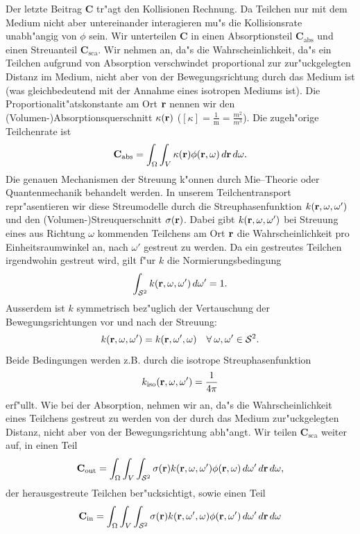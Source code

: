 	Der letzte Beitrag $\mathbf{C}$ tr"agt den Kollisionen Rechnung. Da Teilchen nur mit dem Medium nicht aber untereinander interagieren mu"s die Kollisionsrate unabh"angig von $\phi$ sein. Wir unterteilen $\mathbf{C}$ in einen Absorptionsteil $\mathbf{C}_\text{abs}$ und einen Streuanteil $\mathbf{C}_\text{sca}$. Wir nehmen an, da"s die Wahrscheinlichkeit, da"s ein Teilchen aufgrund von Absorption verschwindet proportional zur zur"uckgelegten Distanz im Medium, nicht aber von der Bewegungsrichtung durch das Medium ist (was gleichbedeutend mit der Annahme eines isotropen Mediums ist). Die Proportionalit"atskonstante am Ort $\mathbf{r}$ nennen wir den (Volumen-)Absorptionsquerschnitt $\kappa(\mathbf{r})$ ($[\kappa]=\frac{1}{\text{m}}=\frac{m^2}{m^3}$). Die zugeh"orige Teilchenrate ist
	$$\mathbf{C}_\text{abs}=\int_\Omega \int_V \kappa(\mathbf{r})\phi(\mathbf{r},\omega)\,d\mathbf{r}\,d\omega.$$
	Die genauen Mechanismen der Streuung k"onnen durch Mie--Theorie oder Quantenmechanik behandelt werden. In unserem Teilchentransport repr"asentieren wir diese Streumodelle durch die Streuphasenfunktion $k(\mathbf{r},\omega,\omega')$ und den (Volumen-)Streuquerschnitt $\sigma(\mathbf{r})$. Dabei gibt $k(\mathbf{r},\omega,\omega')$ bei Streuung eines aus Richtung $\omega$ kommenden Teilchens am Ort $\mathbf{r}$ die Wahrscheinlichkeit pro Einheitsraumwinkel an, nach $\omega'$ gestreut zu werden. Da ein gestreutes Teilchen irgendwohin gestreut wird, gilt f"ur $k$ die Normierungsbedingung
	\begin{equation}\label{eq:k_norm_req}
	  \int_{\mathcal{S}^2} k(\mathbf{r},\omega,\omega')\,d\omega'=1.
	\end{equation}
	Ausserdem ist $k$ symmetrisch bez"uglich der Vertauschung der Bewegungsrichtungen vor und nach der Streuung:
	$$k(\mathbf{r},\omega,\omega')=k(\mathbf{r},\omega',\omega)\quad \forall\:\omega,\omega'\in\mathcal{S}^2.$$
	Beide Bedingungen werden z.B. durch die isotrope Streuphasenfunktion $$k_\text{iso}(\mathbf{r},\omega,\omega')=\frac{1}{4\pi}$$ erf"ullt.
	Wie bei der Absorption, nehmen wir an, da"s die Wahrscheinlichkeit eines Teilchens gestreut zu werden von der durch das Medium zur"uckgelegten Distanz, nicht aber von der Bewegungsrichtung abh"angt. Wir teilen $\mathbf{C}_\text{sca}$ weiter auf, in einen Teil
	$$\mathbf{C}_\text{out}=\int_\Omega \int_V \int_{\mathcal{S}^2} \sigma{(\mathbf{r})}k(\mathbf{r},\omega,\omega')\phi(\mathbf{r},\omega)\,d\omega'\,d\mathbf{r}\,d\omega,$$
	der herausgestreute Teilchen ber"ucksichtigt, sowie einen Teil
	$$\mathbf{C}_\text{in}=\int_\Omega \int_V \int_{\mathcal{S}^2} \sigma{(\mathbf{r})}k(\mathbf{r},\omega',\omega)\phi(\mathbf{r},\omega')\,d\omega'\,d\mathbf{r}\,d\omega$$
